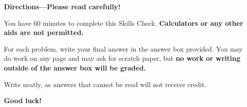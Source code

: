 \documentclass{article}
\begin{document}


{\Large
\begin{center}\textbf{Directions---Please read carefully!} \end{center}}

You have 60 minutes to complete this Skills Check. \textbf{Calculators or any other aids are not permitted.}  


For each problem, write your final answer in the answer box provided. You may do work on any page and may ask for scratch paper, but \textbf{no work or writing outside of the answer box will be graded.}

Write neatly, as answers that cannot be read will not receive credit. 

   

\begin{center}\textbf{Good luck!}\end{center}


\newpage
\end{document}
